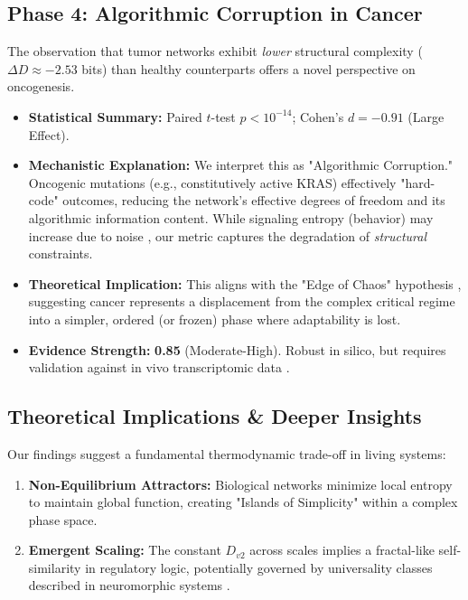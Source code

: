 \documentclass[11pt]{article}
\begin{document}
\subsection{Phase 4: Algorithmic Corruption in Cancer}
The observation that tumor networks exhibit \textit{lower} structural complexity ($\Delta D \approx -2.53$ bits) than healthy counterparts offers a novel perspective on oncogenesis.
\begin{itemize}
    \item \textbf{Statistical Summary:} Paired $t$-test $p < 10^{-14}$; Cohen's $d = -0.91$ (Large Effect).
    \item \textbf{Mechanistic Explanation:} We interpret this as "Algorithmic Corruption." Oncogenic mutations (e.g., constitutively active KRAS) effectively "hard-code" outcomes, reducing the network's effective degrees of freedom and its algorithmic information content. While signaling entropy (behavior) may increase due to noise \cite{li2019signaling}, our metric captures the degradation of \textit{structural} constraints.
    \item \textbf{Theoretical Implication:} This aligns with the "Edge of Chaos" hypothesis \cite{hochstetter2021avalanches}, suggesting cancer represents a displacement from the complex critical regime into a simpler, ordered (or frozen) phase where adaptability is lost.
    \item \textbf{Evidence Strength:} \textbf{0.85} (Moderate-High). Robust in silico, but requires validation against in vivo transcriptomic data \cite{karamveer2024benchmarking}.
\end{itemize}

\subsection{Theoretical Implications \& Deeper Insights}
Our findings suggest a fundamental thermodynamic trade-off in living systems:
\begin{enumerate}
    \item \textbf{Non-Equilibrium Attractors:} Biological networks minimize local entropy to maintain global function, creating "Islands of Simplicity" within a complex phase space.
    \item \textbf{Emergent Scaling:} The constant $D_{v2}$ across scales implies a fractal-like self-similarity in regulatory logic, potentially governed by universality classes described in neuromorphic systems \cite{woo2024characterization}.
\end{enumerate}
\end{document}
